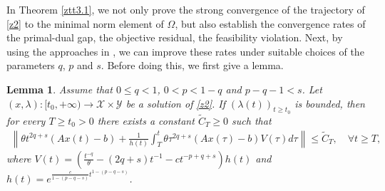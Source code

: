 \documentclass[review]{elsarticle}
\newtheorem{lemma}{Lemma}[section]
\begin{document}
	
	In Theorem \ref{ztt3.1}, we not only prove  the strong convergence of the trajectory of \eqref{z2} to the minimal norm element of $\Omega$, but also  establish the convergence rates of the primal-dual gap, the objective residual, the feasibility violation. Next, by  using the approaches  in  \cite{HeHFiietal(2022), HeTLFconver(2023),ChbaniRBOn(2024)}, we can improve these rates  under  suitable choices of the parameters $q$, $p$ and $s$. Before doing this, we first give  a lemma.
	
	\begin{lemma}\label{lemma3.2}
		Assume that $0\leq q<1$, $0<p<1-q$ and $p-q-1<s$. Let $(x,\lambda): [t_{0},+\infty)\rightarrow \mathcal{X}\times\mathcal{Y}$ be a solution of \eqref{z2}. If  $(\lambda(t))_{t\geq t_0}$ is bounded, then for every $T\geq t_0>0$ there exists a constant $\widetilde{C}_{T}\geq0$ such that
		\begin{eqnarray*}
			\left\|\theta t^{2q+s}(Ax(t)-b)+\frac{1}{h(t)}\int_{T}^{t}\theta \tau^{2q+s}(Ax(\tau)-b)V(\tau)d\tau\right\|\leq\widetilde{C}_{T}, \quad \forall t\geq T,
		\end{eqnarray*}	
		where $V(t)=\left(\frac{t^{-q}}{\theta}-(2q+s)t^{-1}-ct^{-p+q+s}\right)h(t)$ and $h(t)=e^{\frac{c}{1-(p-q-s)}t^{1-(p-q-s)}}$.
	\end{lemma}
	
\end{document}
